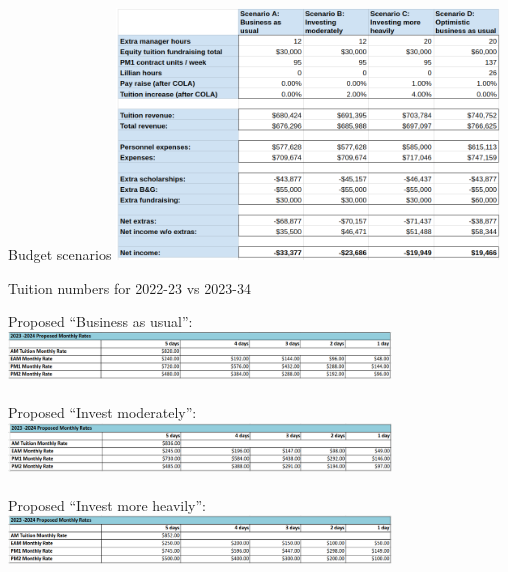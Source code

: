 \documentclass[8pt]{beamer}
\begin{document}
\begin{frame}{Budget scenarios}
\includegraphics[width=4in]{budget_scenarios.png}
\end{frame}

%
%

\begin{frame}{Tuition numbers for 2022-23 vs 2023-34}

\begin{center}

Proposed ``Business as usual'':
\includegraphics[width=4in]{scenario_a_tuition.png}
\\\hrulefill\\

Proposed ``Invest moderately'':
\includegraphics[width=4in]{scenario_b_tuition.png}
\\\hrulefill\\

Proposed ``Invest more heavily'':
\includegraphics[width=4in]{scenario_c_tuition.png}
\\\hrulefill\\


\end{center}
\end{frame}
\end{document}
